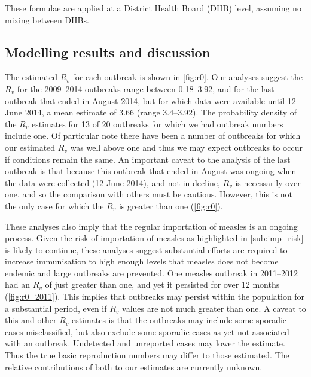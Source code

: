 \documentclass{article}
\begin{document}
These formulae are applied at a District Health Board (DHB) level, assuming no mixing between DHBs.

\subsection{Modelling results and discussion}

The estimated $R_v$ for each outbreak is shown in \autoref{fig:r0}. Our analyses suggest the $R_v$ for the 2009--2014 outbreaks range between 0.18--3.92, and for the last outbreak that ended in August 2014, but for which data were available until 12 June 2014, a mean estimate of 3.66 (range 3.4--3.92). The probability density of the $R_v$ estimates for 13 of 20 outbreaks for which we had outbreak numbers include one. Of particular note there have been a number of outbreaks for which our estimated $R_v$ was well above one and thus we may expect outbreaks to occur if conditions remain the same. An important caveat to the analysis of the last outbreak is that because this outbreak that ended in August was ongoing when the data were collected (12 June 2014), and not in decline, $R_v$ is necessarily over one, and so the comparison with others must be cautious. However, this is not the only case for which the $R_v$ is greater than one (\autoref{fig:r0}).

These analyses also imply that the regular importation of measles is an ongoing process. Given the risk of importation of measles as highlighted in \autoref{sub:imp_risk} is likely to continue, these analyses suggest substantial efforts are required to increase immunisation to high enough levels that measles does not become endemic and large outbreaks are prevented. One measles outbreak in 2011--2012 had an $R_v$ of just greater than one, and yet it persisted for over 12 months (\autoref{fig:r0_2011}). This implies that outbreaks may persist within the population for a substantial period, even if $R_v$ values are not much greater than one. A caveat to this and other $R_v$ estimates is that the outbreaks may include some sporadic cases misclassified, but also exclude some sporadic cases as yet not associated with an outbreak. Undetected and unreported cases may lower the estimate. Thus the true basic reproduction numbers may differ to those estimated. The relative contributions of both to our estimates are currently unknown. 
\end{document}
